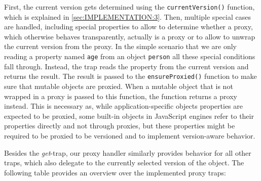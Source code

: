 \iffalse
\begin{verbatim}\fi
\begin{code}{}{}
get: function(dummyTarget, name, receiver) {

    var version = this.currentVersion();
    
    // proxy meta information and other special cases..
    if (name === 'isProxy') {
    // ...
    if (name === 'proxyTarget') {
    // ...
    
    result = version[name];
    
    return this.ensureProxied(result);
}
\end{code}
\iffalse
\end{verbatim}\fi

First, the current version gets determined using the \lstinline{currentVersion()} function, which is explained in \ref{sec:IMPLEMENTATION:3}.
Then, multiple special cases are handled, including special properties to allow to determine whether a proxy, which otherwise behaves transparently, actually is a proxy or to allow to unwrap the current version from the proxy.
In the simple scenario that we are only reading a property named \lstinline{age} from an object \lstinline{person} all these special conditions fall through.
Instead, the trap reads the property from the current version and returns the result.
The result is passed to the \lstinline{ensureProxied()} function to make sure that mutable objects are proxied.
When a mutable object that is not wrapped in a proxy is passed to this function, the function returns a proxy instead.
This is necessary as, while application-specific objects properties are expected to be proxied, some built-in objects in JavaScript engines refer to their properties directly and not through proxies, but these properties might be required to be proxied to be versioned and to implement version-aware behavior.


Besides the \emph{get}-trap, our proxy handler similarly provides behavior for all other traps, which also delegate to the currently selected version of the object.
The following table  provides an overview over the implemented proxy traps:


